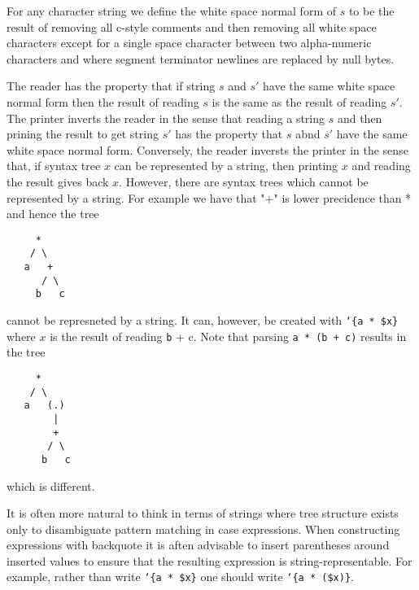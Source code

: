 \documentclass{article}
\newcommand{\mtt}[1]{\mbox{\tt #1}}
\begin{document}
For any character string we define the white space normal form of $s$
to be the result of removing all c-style comments and then removing all white space characters except for
a single space character between two alpha-numeric characters and where segment terminator newlines
are replaced by null bytes.

The reader has the property that if string $s$ and $s'$ have the same white space normal form then the result of reading
$s$ is the same as the result of reading $s'$.  The printer inverts the reader
in the sense that reading a string $s$ and then prining the result to get string $s'$ has the property that $s$ abnd $s'$ have the same white space normal form.
Conversely, the reader inversts the printer in the sense that, if syntax tree $x$ can be represented by a string, then printing $x$ and reading the result gives back $x$.
However, there are syntax trees which cannot be represented by a string.  For example we have that "+" is lower precidence than * and hence the tree
\begin{verbatim}
     *
    / \
   a   +
      / \
     b   c
\end{verbatim}
cannot be represneted by a string. It can, however, be created with {\tt `\{a * \$x\}} where $x$ is the result of reading {\mtt b + c}.
Note that parsing {\tt a * (b + c)} results in the tree
\begin{verbatim}
     *
    / \
   a   (.)
        |
        +
       / \
      b   c
\end{verbatim}
which is different.

It is often more natural to think in terms of strings where tree structure exists only to disambiguate
pattern matching in case expressions.  When constructing expressions with backquote it is aften advisable to insert
parentheses around inserted values to ensure that the resulting expression is string-representable.  For example,
rather than write {\tt `\{a * \$x\}} one should write {\tt `\{a * (\$x)\}}.
\end{document}
